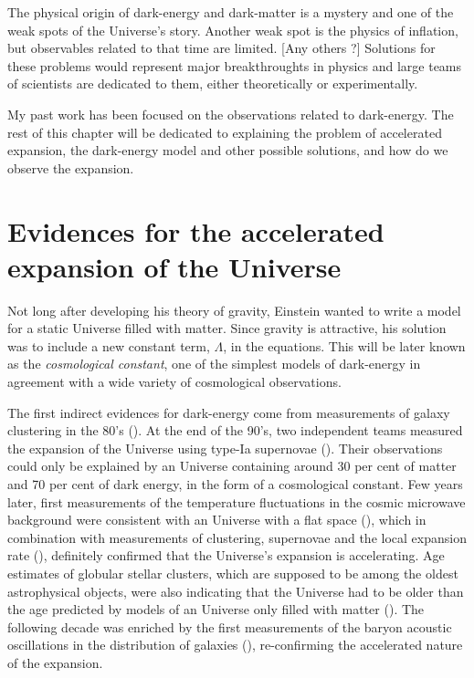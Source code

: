     The physical origin of dark-energy and dark-matter is a mystery and one of the weak spots 
    of the Universe's story. Another weak spot is the physics of inflation, but observables 
    related to that time are limited. [Any others ?] Solutions for these problems 
    would represent major breakthroughts in physics and large teams of scientists are dedicated
    to them, either theoretically or experimentally. 

    My past work has been focused on the observations related to dark-energy. 
    The rest of this chapter will be dedicated to explaining the problem 
    of accelerated expansion, the dark-energy model and other possible solutions,
    and how do we observe the expansion. 

\section{Evidences for the accelerated expansion of the Universe}

    Not long after developing his theory of gravity, Einstein wanted to write a model 
    for a static Universe filled with matter. Since gravity is attractive, his solution 
    was to include a new constant term, $\Lambda$, in the equations. This will be later
    known as the \emph{cosmological constant}, one of the simplest models of dark-energy
    in agreement with a wide variety of cosmological observations. 
    
    The first indirect evidences for dark-energy come from measurements of galaxy clustering in 
    the 80's (\cite{maddoxGalaxyCorrelationsLarge1990, 
    efstathiouCosmologicalConstantCold1990}). 
    At the end of the 90's, two independent teams measured the expansion of 
    the Universe using type-Ia supernovae 
    (\cite{riessObservationalEvidenceSupernovae1998, perlmutterMeasurementsOmegaLambda1999}). 
    Their observations could only be explained by 
    an Universe containing around 30 per cent of matter and 70 per cent of dark energy,
    in the form of a cosmological constant. Few years later, first measurements of the 
    temperature fluctuations in the cosmic microwave background were consistent with 
    an Universe with a flat space (\cite{balbiConstraintsCosmologicalParameters2000,
    debernardisFlatUniverse2000}), 
    which in combination with measurements of clustering, 
    supernovae and the local expansion rate (\cite{mouldHubbleSpaceTelescope2000}), 
    definitely confirmed that the Universe's expansion is accelerating. 
    Age estimates of globular stellar clusters, which are
    supposed to be among the oldest astrophysical objects, were also indicating that 
    the Universe had to be older than the age predicted by models of an Universe only 
    filled with matter (\cite{chaboyerAgeUniverse1998}). 
    The following decade was enriched by the first measurements
    of the baryon acoustic oscillations in the distribution of galaxies
    (\cite{eisensteinDetectionBaryonAcoustic2005, cole2dFGalaxyRedshift2005}),
    re-confirming the accelerated nature of the expansion.
    
